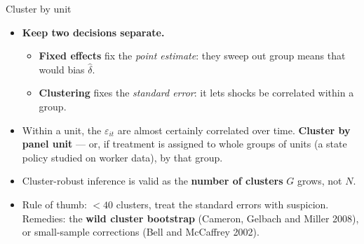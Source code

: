 \documentclass[
  11pt,
  ignorenonframetext,
  aspectratio=169,
]{beamer}
\providecommand{\tightlist}{%
  \setlength{\itemsep}{0pt}\setlength{\parskip}{0pt}}
\begin{document}
\begin{frame}{Cluster by unit}
\protect{}\label{cluster-by-unit}
\begin{itemize}
\tightlist
\item
  \textbf{Keep two decisions separate.}

  \begin{itemize}
  \tightlist
  \item
    \textbf{Fixed effects} fix the \emph{point estimate}: they sweep out
    group means that would bias \(\hat\delta\).
  \item
    \textbf{Clustering} fixes the \emph{standard error}: it lets shocks
    be correlated within a group.
  \end{itemize}
\item
  Within a unit, the \(\varepsilon_{it}\) are almost certainly
  correlated over time. \textbf{Cluster by panel unit} --- or, if
  treatment is assigned to whole groups of units (a state policy studied
  on worker data), by that group.
\end{itemize}

\vspace{0.3em}

\begin{itemize}
\tightlist
\item
  Cluster-robust inference is valid as the \textbf{number of clusters}
  \(G\) grows, not \(N\).
\item
  Rule of thumb: \(<40\) clusters, treat the standard errors with
  suspicion. Remedies: the \textbf{wild cluster bootstrap} (Cameron,
  Gelbach and Miller 2008), or small-sample corrections (Bell and
  McCaffrey 2002).
\end{itemize}
\end{frame}
\end{document}
